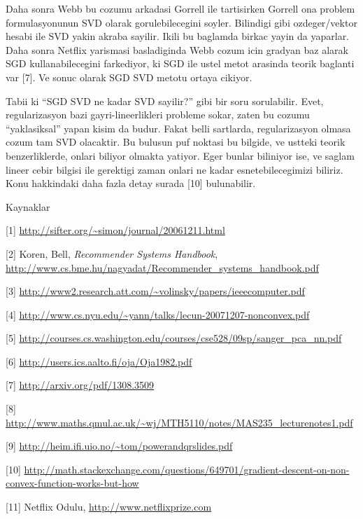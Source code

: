 \documentclass[12pt,fleqn]{article}\usepackage{../common}
\begin{document}
Daha sonra Webb bu cozumu arkadasi Gorrell ile tartisirken Gorrell ona
problem formulasyonunun SVD olarak gorulebilecegini soyler. Bilindigi gibi
ozdeger/vektor hesabi ile SVD yakin akraba sayilir. Ikili bu baglamda
birkac yayin da yaparlar. Daha sonra Netflix yarismasi basladiginda Webb
cozum icin gradyan baz alarak SGD kullanabilecegini farkediyor, ki SGD ile
ustel metot arasinda teorik baglanti var [7]. Ve sonuc olarak SGD SVD
metotu ortaya cikiyor.

Tabii ki ``SGD SVD ne kadar SVD sayilir?'' gibi bir soru sorulabilir. Evet,
regularizasyon bazi gayri-lineerlikleri probleme sokar, zaten bu cozumu
``yaklasiksal'' yapan kisim da budur. Fakat belli sartlarda, regularizasyon
olmasa cozum tam SVD olacaktir. Bu bulusun puf noktasi bu bilgide, ve
ustteki teorik benzerliklerde, onlari biliyor olmakta yatiyor. Eger bunlar
biliniyor ise, ve saglam lineer cebir bilgisi ile gerektigi zaman onlari ne
kadar esnetebilecegimizi biliriz. Konu hakkindaki daha fazla detay surada
[10] bulunabilir.

Kaynaklar

[1] \url{http://sifter.org/~simon/journal/20061211.html}

[2] Koren, Bell, {\em Recommender Systems Handbook},
\url{http://www.cs.bme.hu/nagyadat/Recommender_systems_handbook.pdf}

[3] \url{http://www2.research.att.com/~volinsky/papers/ieeecomputer.pdf}

[4] \url{http://www.cs.nyu.edu/~yann/talks/lecun-20071207-nonconvex.pdf}

[5] \url{http://courses.cs.washington.edu/courses/cse528/09sp/sanger_pca_nn.pdf}

[6] \url{http://users.ics.aalto.fi/oja/Oja1982.pdf}

[7] \url{http://arxiv.org/pdf/1308.3509}

[8] \url{http://www.maths.qmul.ac.uk/~wj/MTH5110/notes/MAS235_lecturenotes1.pdf}

[9] \url{http://heim.ifi.uio.no/~tom/powerandqrslides.pdf}

[10] \url{http://math.stackexchange.com/questions/649701/gradient-descent-on-non-convex-function-works-but-how}

[11] Netflix Odulu, \url{http://www.netflixprize.com}
\end{document}
